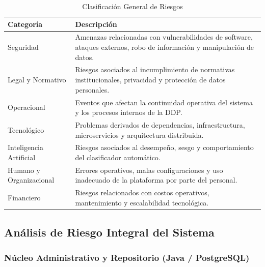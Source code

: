\documentclass[12pt,oneside,letterpaper]{book}
\renewcommand{\arraystretch}{1.3}
\begin{document}
\begin{table}[H]
\centering
\caption{Clasificación General de Riesgos}
\label{tab:clasificacion_riesgos}
\renewcommand{\arraystretch}{1.4}
\begin{tabular}{|p{3cm}|p{10cm}|}
\hline
\textbf{Categoría} & \textbf{Descripción} \\ \hline

Seguridad &
Amenazas relacionadas con vulnerabilidades de software, ataques externos, robo de información y manipulación de datos. \\ \hline

Legal y Normativo &
Riesgos asociados al incumplimiento de normativas institucionales, privacidad y protección de datos personales. \\ \hline

Operacional &
Eventos que afectan la continuidad operativa del sistema y los procesos internos de la DDP. \\ \hline

Tecnológico &
Problemas derivados de dependencias, infraestructura, microservicios y arquitectura distribuida. \\ \hline

Inteligencia Artificial &
Riesgos asociados al desempeño, sesgo y comportamiento del clasificador automático. \\ \hline

Humano y Organizacional &
Errores operativos, malas configuraciones y uso inadecuado de la plataforma por parte del personal. \\ \hline

Financiero &
Riesgos relacionados con costos operativos, mantenimiento y escalabilidad tecnológica. \\ \hline

\end{tabular}
\end{table}


\subsection{Análisis de Riesgo Integral del Sistema}

\subsubsection{Núcleo Administrativo y Repositorio (Java / PostgreSQL)}
\end{document}
